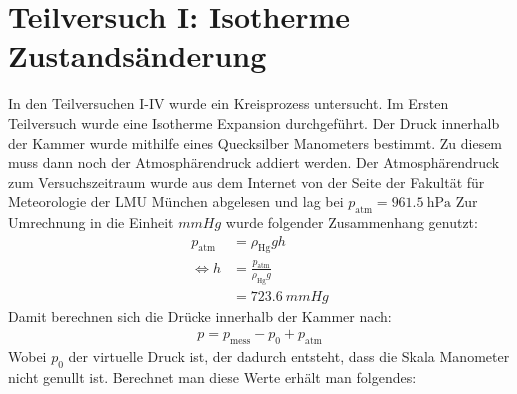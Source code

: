 \documentclass{report}
\begin{document}
\section{Teilversuch I: Isotherme Zustandsänderung}
In den Teilversuchen I-IV wurde ein Kreisprozess untersucht. Im Ersten Teilversuch wurde eine Isotherme Expansion durchgeführt. Der Druck innerhalb der Kammer 
wurde mithilfe eines Quecksilber Manometers bestimmt. Zu diesem muss dann noch der Atmosphärendruck addiert werden.
Der Atmosphärendruck zum Versuchszeitraum wurde aus dem Internet von der Seite der Fakultät für Meteorologie der LMU München abgelesen und lag bei 
$p_{\mathrm{atm}} = \qty{961.5}{\hecto\pascal}$
Zur Umrechnung in die Einheit $\si{mmHg}$ wurde folgender Zusammenhang genutzt:
\begin{equation}
    \begin{split}
        p_{\mathrm{atm}}    &= \rho_{\mathrm{Hg}} g h \\
        \Leftrightarrow h   &= \frac{p_{\mathrm{atm}}}{\rho_{\mathrm{Hg}} g} \\
                            &= \qty{723.6}{mmHg}
    \end{split}
\end{equation}
Damit berechnen sich die Drücke innerhalb der Kammer nach:
\begin{equation}
    \begin{split}
        p = p_{\mathrm{mess}} - p_0 + p_{\mathrm{atm}}
    \end{split}
\end{equation}
Wobei $p_0$ der virtuelle Druck ist, der dadurch entsteht, dass die Skala Manometer nicht genullt ist.
Berechnet man diese Werte erhält man folgendes:
\end{document}
